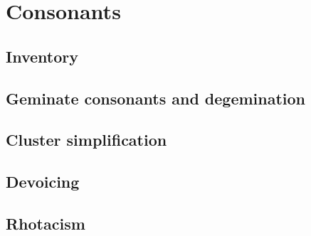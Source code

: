 \chapter{Consonants}

\section{Inventory}

\section{Geminate consonants and degemination}

\section{Cluster simplification}

\section{Devoicing}

\section{Rhotacism}
